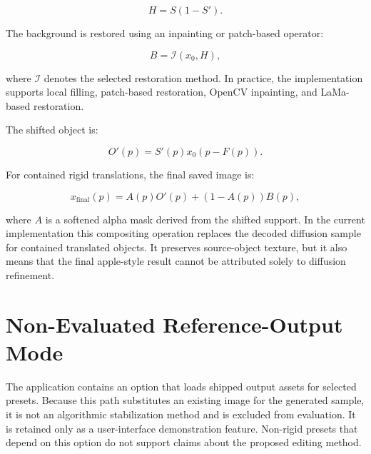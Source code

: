 \begin{equation}
H = S(1-S').
\label{eq:source-hole}
\end{equation}

The background is restored using an inpainting or patch-based operator:

\begin{equation}
B = \mathcal{I}(x_0,H),
\label{eq:background-restore}
\end{equation}

where $\mathcal{I}$ denotes the selected restoration method. In practice, the implementation supports local filling, patch-based restoration, OpenCV inpainting, and LaMa-based restoration.

The shifted object is:

\begin{equation}
O'(p)=S'(p)x_0(p-F(p)).
\label{eq:shifted-object}
\end{equation}

For contained rigid translations, the final saved image is:

\begin{equation}
x_{\mathrm{final}}(p)=A(p)O'(p)+(1-A(p))B(p),
\label{eq:final-composite}
\end{equation}

where $A$ is a softened alpha mask derived from the shifted support. In the current implementation this compositing operation replaces the decoded diffusion sample for contained translated objects. It preserves source-object texture, but it also means that the final apple-style result cannot be attributed solely to diffusion refinement.

\section{Non-Evaluated Reference-Output Mode}

The application contains an option that loads shipped output assets for selected presets. Because this path substitutes an existing image for the generated sample, it is not an algorithmic stabilization method and is excluded from evaluation. It is retained only as a user-interface demonstration feature. Non-rigid presets that depend on this option do not support claims about the proposed editing method.

\FloatBarrier
